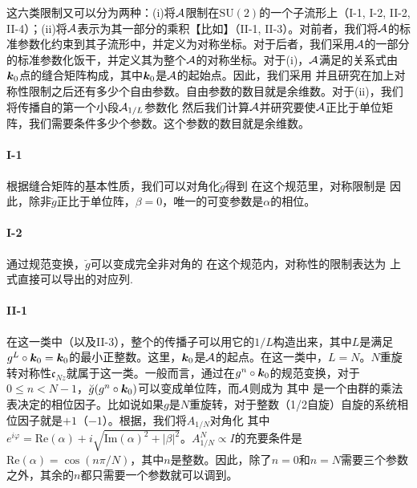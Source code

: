 \begin{appendices}
这六类限制又可以分为两种：(i)将${\cal A}$限制在$\text{SU}(2)$的一个子流形上（I-1, I-2, II-2, II-4）；(ii)将${\cal A}$表示为其一部分的乘积【比如】（II-1, II-3）。对前者，我们将${\cal A}$的标准参数化约束到其子流形中，并定义为对称坐标。对于后者，我们采用${\cal A}$的一部分的标准参数化饭干，并定义其为整个${\cal A}$的对称坐标。对于(i)，${\cal A}$满足的关系式由$\boldsymbol{k}_0$点的缝合矩阵构成，其中$\boldsymbol{k}_0$是${\cal A}$的起始点。因此，我们采用
并且研究在加上对称性限制之后还有多少个自由参数。自由参数的数目就是余维数。对于(ii)，我们将传播自的第一个小段${\cal A}_{1/L}$参数化
然后我们计算${\cal A}$并研究要使${\cal A}$正比于单位矩阵，我们需要条件多少个参数。这个参数的数目就是余维数。

\paragraph*{I-1} 根据缝合矩阵的基本性质，我们可以对角化$\breve{g}$得到
在这个规范里，对称限制是
因此，除非$\breve{g}$正比于单位阵，$\beta=0$，唯一的可变参数是$\alpha$的相位。

\paragraph*{I-2} 通过规范变换，$\breve{g}$可以变成完全非对角的
在这个规范内，对称性的限制表达为
上式直接可以导出的对应列.

\paragraph*{II-1} 在这一类中（以及II-3），整个的传播子可以用它的$1/L$构造出来，其中$L$是满足$g^L\circ \boldsymbol{k}_0=\boldsymbol{k}_0$的最小正整数。这里，$\boldsymbol{k}_0$是${\cal A}$的起点。在这一类中，$L=N$。$N$重旋转对称性$\mathfrak{c}_{Nz}$就属于这一类。一般而言，通过在$g^n\circ \boldsymbol{k}_0$的规范变换，对于$0 \le n < N-1$，$\breve{g}(g^n\circ \boldsymbol{k}_0)$可以变成单位阵，而${\cal A}$则成为
其中
是一个由群的乘法表决定的相位因子。比如说如果$g$是$N$重旋转，对于整数（1/2自旋）自旋的系统相位因子就是$+1$（$-1$）。根据，我们将$A_{1/N}$对角化 
其中$e^{i\varphi}=\text{Re}(\alpha)+i\sqrt{\text{Im}(\alpha)^2+|\beta|^2}$。$A_{1/N}^N \propto I$的充要条件是$\text{Re}(\alpha)=\cos(n\pi/N)$，其中$n$是整数。因此，除了$n=0$和$n=N$需要三个参数之外，其余的$n$都只需要一个参数就可以调到。


\end{appendices}
